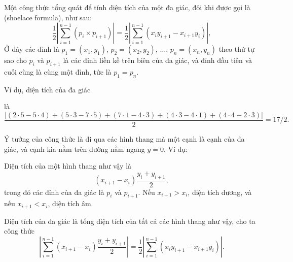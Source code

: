 Một công thức tổng quát để tính diện tích
của một đa giác, đôi khi được gọi là  (shoelace formula),
như sau: 
\[\frac{1}{2} |\sum_{i=1}^{n-1} (p_i \times p_{i+1})| =
\frac{1}{2} |\sum_{i=1}^{n-1} (x_i y_{i+1} - x_{i+1} y_i)|, \]
Ở đây các đỉnh là
$p_1=(x_1,y_1)$, $p_2=(x_2,y_2)$, $\ldots$, $p_n=(x_n,y_n)$
theo thứ tự sao cho
$p_i$ và $p_{i+1}$ là các đỉnh liền kề trên biên
của đa giác,
và đỉnh đầu tiên và cuối cùng là cùng một đỉnh, tức là $p_1=p_n$.

Ví dụ, diện tích của đa giác
\begin{center}
\end{center}
là
\[\frac{|(2\cdot5-5\cdot4)+(5\cdot3-7\cdot5)+(7\cdot1-4\cdot3)+(4\cdot3-4\cdot1)+(4\cdot4-2\cdot3)|}{2} = 17/2.\]

Ý tưởng của công thức là đi qua các hình thang
mà một cạnh là cạnh của đa giác,
và cạnh kia nằm trên đường nằm ngang $y=0$.
Ví dụ:
\begin{center}
\end{center}
Diện tích của một hình thang như vậy là
\[(x_{i+1}-x_{i}) \frac{y_i+y_{i+1}}{2},\]
trong đó các đỉnh của đa giác là $p_i$ và $p_{i+1}$.
Nếu $x_{i+1}>x_{i}$, diện tích dương,
và nếu $x_{i+1}<x_{i}$, diện tích âm.

Diện tích của đa giác là tổng diện tích của
tất cả các hình thang như vậy, cho ta công thức
\[|\sum_{i=1}^{n-1} (x_{i+1}-x_{i}) \frac{y_i+y_{i+1}}{2}| =
\frac{1}{2} |\sum_{i=1}^{n-1} (x_i y_{i+1} - x_{i+1} y_i)|.\]

